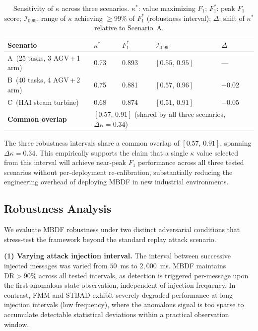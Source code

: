 \documentclass[manuscript,screen,review]{acmart}
\begin{document}
\begin{table}[!t]
\renewcommand{\arraystretch}{1.3}
\caption{Sensitivity of $\kappa$ across three scenarios.
$\kappa^{*}$: value maximizing $F_1$;
$F_1^{*}$: peak $F_1$ score;
$\mathcal{I}_{0.99}$: range of $\kappa$ achieving
$\geq$99\% of $F_1^{*}$ (robustness interval);
$\Delta$: shift of $\kappa^{*}$ relative to Scenario~A.}
\label{tab:kappa_sensitivity}
\centering
\small
\begin{tabular}{lllll}
\toprule
\textbf{Scenario} &
$\kappa^{*}$ & $F_1^{*}$ &
$\mathcal{I}_{0.99}$ & $\Delta$ \\
\midrule
A\ (25 tasks, 3 AGV\,+\,1 arm)  &
  0.73 & 0.893 & $[0.55,\,0.95]$ & ---     \\
B\ (40 tasks, 4 AGV\,+\,2 arm)  &
  0.75 & 0.881 & $[0.57,\,0.96]$ & $+0.02$ \\
C\ (HAI steam turbine)           &
  0.68 & 0.874 & $[0.51,\,0.91]$ & $-0.05$ \\
\midrule
\textbf{Common overlap} &
\multicolumn{4}{l}{$[0.57,\,0.91]$
  (shared by all three scenarios,
  $\Delta\kappa = 0.34$)} \\
\bottomrule
\end{tabular}
\end{table}

The three robustness intervals share a common overlap of
$[0.57,\,0.91]$, spanning $\Delta\kappa = 0.34$. This
empirically supports the claim that a single $\kappa$
value selected from this interval will achieve near-peak
$F_1$ performance across all three tested scenarios
without per-deployment re-calibration, substantially
reducing the engineering overhead of deploying MBDF in
new industrial environments.

\subsection{Robustness Analysis}
\label{sec:robustness}

We evaluate MBDF robustness under two distinct adversarial
conditions that stress-test the framework beyond the
standard replay attack scenario.

\textbf{(1) Varying attack injection interval.}
The interval between successive injected messages was
varied from $50$~ms to $2{,}000$~ms. MBDF maintains
$\mathrm{DR} > 90\%$ across all tested intervals, as
detection is triggered per-message upon the first
anomalous state observation, independent of injection
frequency. In contrast, FMM and STBAD exhibit severely
degraded performance at long injection intervals (low
frequency), where the anomalous signal is too sparse to
accumulate detectable statistical deviations within a
practical observation window.
\end{document}
